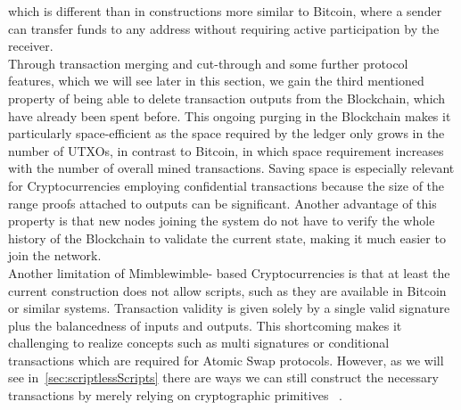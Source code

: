 which is different than in constructions more similar to Bitcoin, where a sender can transfer funds to any address without requiring active participation by the receiver.\\
Through transaction merging and cut-through and some further protocol features, which we will see later in this section, we gain the third mentioned property of being able
to delete transaction outputs from the Blockchain, which have already been spent before. This ongoing purging in the Blockchain makes it particularly space-efficient as the
space required by the ledger only grows in the number of UTXOs, in contrast to Bitcoin, in which space requirement increases with the number of overall mined transactions.
Saving space is especially relevant for Cryptocurrencies employing confidential transactions because the size of the range proofs attached to outputs can be significant.
Another advantage of this property is that new nodes joining the system do not have to verify the whole history of the Blockchain to validate the current state, making it much easier to join the network. \\
Another limitation of Mimblewimble- based Cryptocurrencies is that at least the current construction does not allow scripts, such as they are available in Bitcoin or similar systems.
Transaction validity is given solely by a single valid signature plus the balancedness of inputs and outputs.
This shortcoming makes it challenging to realize concepts such as multi signatures or conditional transactions which are required for Atomic Swap protocols. However,
as we will see in~\ref{sec:scriptlessScripts} there are ways we can still construct the necessary transactions by merely relying on cryptographic primitives ~\cite{fuchsbauer2019aggregate}.
